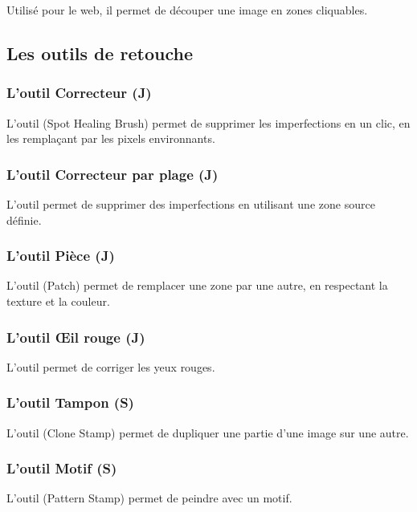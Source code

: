 Utilisé pour le web, il permet de découper une image en zones cliquables.

\subsection{Les outils de retouche}

\subsubsection{L'outil Correcteur (J)}

L'outil  (Spot Healing Brush) permet de supprimer les imperfections en un clic, en les remplaçant par les pixels environnants.

\subsubsection{L'outil Correcteur par plage (J)}

L'outil  permet de supprimer des imperfections en utilisant une zone source définie.

\subsubsection{L'outil Pièce (J)}

L'outil  (Patch) permet de remplacer une zone par une autre, en respectant la texture et la couleur.

\subsubsection{L'outil Œil rouge (J)}

L'outil  permet de corriger les yeux rouges.

\subsubsection{L'outil Tampon (S)}

L'outil  (Clone Stamp) permet de dupliquer une partie d'une image sur une autre.

\subsubsection{L'outil Motif (S)}

L'outil  (Pattern Stamp) permet de peindre avec un motif.

